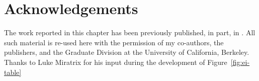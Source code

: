 \section*{Acknowledgements}

The work reported in this chapter has been previously published, in part, in
\textcite{clark_known_2010}.  All such material is re-used here with the
permission of my co-authors, the publishers, and the Graduate Division at the
University of California, Berkeley. Thanks to Luke Miratrix for his input during
the development of Figure~\ref{fig:ei-table}
